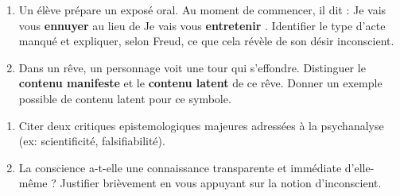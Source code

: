 \documentclass[11pt]{article}
\begin{document}
\begin{exercice}
\begin{enumerate}
    \item Un élève prépare un exposé oral. Au moment de commencer, il dit : \og Je vais vous \textbf{ennuyer} \fg{} au lieu de \og Je vais vous \textbf{entretenir} \fg{}. Identifier le type d'acte manqué et expliquer, selon Freud, ce que cela révèle de son désir inconscient.
    \item Dans un rêve, un personnage voit une \og tour \fg{} qui s'effondre. Distinguer le \textbf{contenu manifeste} et le \textbf{contenu latent} de ce rêve. Donner un exemple possible de contenu latent pour ce symbole.
\end{enumerate}
\end{exercice}

\begin{exercice}
\begin{enumerate}
    \item Citer deux critiques epistemologiques majeures adressées à la psychanalyse (ex: scientificité, falsifiabilité).
    \item La conscience a-t-elle une connaissance transparente et immédiate d'elle-même ? Justifier brièvement en vous appuyant sur la notion d'inconscient.
\end{enumerate}
\end{exercice}
\end{document}
